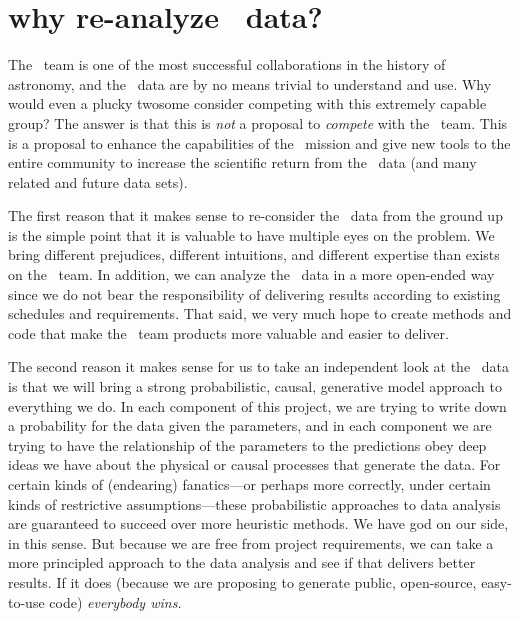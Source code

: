 \documentclass[letterpaper,12pt]{article}
\begin{document}
\section{why re-analyze \Kepler\ data?}

The \Kepler\ team is one of the most successful collaborations in the
history of astronomy, and the \Kepler\ data are by no means trivial to
understand and use.  Why would even a plucky twosome consider
competing with this extremely capable group?  The answer is that this
is \emph{not} a proposal to \emph{compete} with the \Kepler\ team.
This is a proposal to enhance the capabilities of the \Kepler\ mission
and give new tools to the entire community to increase the scientific
return from the \Kepler\ data (and many related and future data sets).

The first reason that it makes sense to re-consider the \Kepler\ data
from the ground up is the simple point that it is valuable to have
multiple eyes on the problem.  We bring different prejudices,
different intuitions, and different expertise than exists on the
\Kepler\ team.  In addition, we can analyze the \Kepler\ data in a
more open-ended way since we do not bear the responsibility of
delivering results according to existing schedules and requirements.
That said, we very much hope to create methods and code that make the
\Kepler\ team products more valuable and easier to deliver.

The second reason it makes sense for us to take an independent look at
the \Kepler\ data is that we will bring a strong probabilistic,
causal, generative model approach to everything we do.  In each
component of this project, we are trying to write down a probability
for the data given the parameters, and in each component we are trying
to have the relationship of the parameters to the predictions obey
deep ideas we have about the physical or causal processes that
generate the data.  For certain kinds of (endearing) fanatics---or
perhaps more correctly, under certain kinds of restrictive
assumptions---these probabilistic approaches to data analysis are
guaranteed to succeed over more heuristic methods.  We have god on our
side, in this sense.  But because we are free from project
requirements, we can take a more principled approach to the data
analysis and see if that delivers better results.  If it does (because
we are proposing to generate public, open-source, easy-to-use code)
\emph{everybody wins.}
\end{document}
